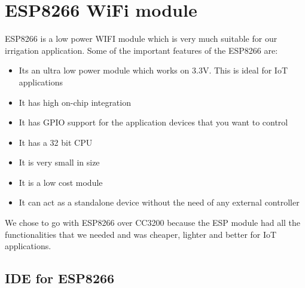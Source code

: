 \documentclass[16pt]{article}
\begin{document}
\vspace{12cm}
\section{ESP8266 WiFi module}

\vspace{0.5cm}

ESP8266 is a low power WIFI module which is very much suitable for our
irrigation application. Some of the important features of the ESP8266
are:


\begin{itemize}

\item
  Its an ultra low power module which works on 3.3V. This is ideal for
  IoT applications
\item
  It has high on-chip integration
\item
  It has GPIO support for the application devices that you want to
  control
\item
  It has a 32 bit CPU
\item
  It is very small in size
\item
  It is a low cost module
\item
  It can act as a standalone device without the need of any external
  controller
\end{itemize}


\vspace{0.4cm}

We chose to go with ESP8266 over CC3200 because the ESP module had all
the functionalities that we needed and was cheaper, lighter and better
for IoT applications.




\subsection{IDE for ESP8266}
\end{document}
